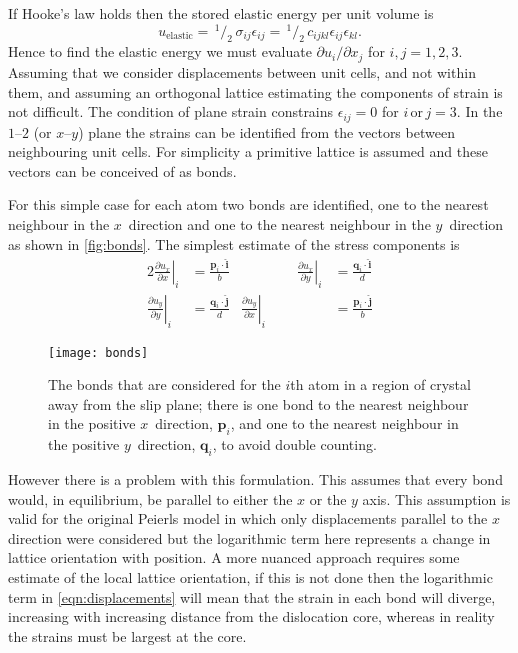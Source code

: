 If Hooke's law holds then the stored elastic energy per unit volume is
\begin{equation}
u_{\text{elastic}} =\, ^{1}\!/_{2}\, \sigma_{ij} \epsilon_{ij} =\, ^{1}\!/_{2}\, c_{ijkl} \epsilon_{ij} \epsilon_{kl}.
\end{equation}
Hence to find the elastic energy we must evaluate \({\partial u_i}/{\partial x_j}\) for $i, j = 1, 2, 3$.
Assuming that we consider displacements between unit cells, and not within them, and assuming an orthogonal lattice estimating the components of strain is not difficult. The  condition of plane strain constrains $\epsilon_{ij} = 0$ for $i\, \text{or}\, j=3$. In the $1$--$2$ (or $x$--$y$) plane the strains can be identified from the vectors between neighbouring unit cells. For simplicity a primitive lattice is assumed and these vectors can be conceived of as bonds.

For this simple case for each atom two bonds are identified, one to the nearest neighbour in the $x$~direction and one to the nearest neighbour in the $y$~direction as shown in \autoref{fig:bonds}. The simplest estimate of the stress components is
\begin{alignat}{2}\label{eqn:estimate_strains}
\left. \frac{\partial u_x}{\partial x}\right|_i &= \frac{\mathbf{p}_i \cdot \mathbf{\hat{i}}}{b} &\qquad\qquad
\left. \frac{\partial u_x}{\partial y}\right|_i &= \frac{\mathbf{q}_i \cdot \mathbf{\hat{i}}}{d} \nonumber\\
\left. \frac{\partial u_y}{\partial y}\right|_i &= \frac{\mathbf{q}_i \cdot \mathbf{\hat{j}}}{d} &
\left. \frac{\partial u_y}{\partial x}\right|_i &= \frac{\mathbf{p}_i \cdot \mathbf{\hat{j}}}{b}
\end{alignat}


\begin{figure}
\centering
\texttt{[image: bonds]}
\caption{The bonds that are considered for the $i$th atom in a region of crystal away from the slip plane; there is one bond to the nearest neighbour in the positive $x$~direction, $\mathbf{p}_i$, and one to the nearest neighbour in the positive $y$~direction, $\mathbf{q}_i$, to avoid double counting.\label{fig:bonds} }
\end{figure}





However there is a problem with this formulation. This assumes that every bond would, in equilibrium, be parallel to either the $x$ or the $y$ axis. This assumption is valid for the original Peierls model in which only displacements parallel to the $x$ direction were considered but the logarithmic term here represents a change in lattice orientation with position. A more nuanced approach requires some estimate of the local lattice orientation, if this is not done then the logarithmic term in \autoref{eqn:displacements} will mean that the strain in each bond will diverge, increasing with increasing distance from the dislocation core, whereas in reality the strains must be largest at the core.

